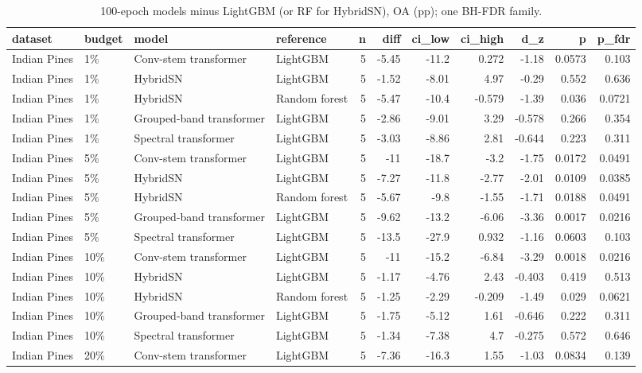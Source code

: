 \begin{table}
\caption{100-epoch models minus LightGBM (or RF for HybridSN), OA (pp); one BH-FDR family.}
\label{tab:stats_long_vs_baselines}
\begin{tabular}{llllrrrrrrr}
\toprule
dataset & budget & model & reference & n & diff & ci\_low & ci\_high & d\_z & p & p\_fdr \\
\midrule
Indian Pines & 1\% & Conv-stem transformer & LightGBM & 5 & -5.45 & -11.2 & 0.272 & -1.18 & 0.0573 & 0.103 \\
Indian Pines & 1\% & HybridSN & LightGBM & 5 & -1.52 & -8.01 & 4.97 & -0.29 & 0.552 & 0.636 \\
Indian Pines & 1\% & HybridSN & Random forest & 5 & -5.47 & -10.4 & -0.579 & -1.39 & 0.036 & 0.0721 \\
Indian Pines & 1\% & Grouped-band transformer & LightGBM & 5 & -2.86 & -9.01 & 3.29 & -0.578 & 0.266 & 0.354 \\
Indian Pines & 1\% & Spectral transformer & LightGBM & 5 & -3.03 & -8.86 & 2.81 & -0.644 & 0.223 & 0.311 \\
Indian Pines & 5\% & Conv-stem transformer & LightGBM & 5 & -11 & -18.7 & -3.2 & -1.75 & 0.0172 & 0.0491 \\
Indian Pines & 5\% & HybridSN & LightGBM & 5 & -7.27 & -11.8 & -2.77 & -2.01 & 0.0109 & 0.0385 \\
Indian Pines & 5\% & HybridSN & Random forest & 5 & -5.67 & -9.8 & -1.55 & -1.71 & 0.0188 & 0.0491 \\
Indian Pines & 5\% & Grouped-band transformer & LightGBM & 5 & -9.62 & -13.2 & -6.06 & -3.36 & 0.0017 & 0.0216 \\
Indian Pines & 5\% & Spectral transformer & LightGBM & 5 & -13.5 & -27.9 & 0.932 & -1.16 & 0.0603 & 0.103 \\
Indian Pines & 10\% & Conv-stem transformer & LightGBM & 5 & -11 & -15.2 & -6.84 & -3.29 & 0.0018 & 0.0216 \\
Indian Pines & 10\% & HybridSN & LightGBM & 5 & -1.17 & -4.76 & 2.43 & -0.403 & 0.419 & 0.513 \\
Indian Pines & 10\% & HybridSN & Random forest & 5 & -1.25 & -2.29 & -0.209 & -1.49 & 0.029 & 0.0621 \\
Indian Pines & 10\% & Grouped-band transformer & LightGBM & 5 & -1.75 & -5.12 & 1.61 & -0.646 & 0.222 & 0.311 \\
Indian Pines & 10\% & Spectral transformer & LightGBM & 5 & -1.34 & -7.38 & 4.7 & -0.275 & 0.572 & 0.646 \\
Indian Pines & 20\% & Conv-stem transformer & LightGBM & 5 & -7.36 & -16.3 & 1.55 & -1.03 & 0.0834 & 0.139 \\

\end{tabular}
\end{table}

